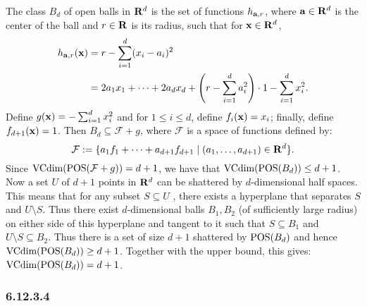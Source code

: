 The class $B_d$ of open balls in $\mathbf{R}^d$ is the set of functions $h_{\mathbf{a}, r}$,
where $\mathbf{a} \in \mathbf{R}^d$ is the center of the ball and $r \in \mathbf{R}$ is its radius,
such that for $\mathbf{x} \in \mathbf{R}^d$,
\begin{align*}
    h_{\mathbf{a}, r} (\mathbf{x}) & = r - \sum_{i = 1}^d (x_i - a_i)^2 \\
    & = 2 a_1 x_1 + \cdots + 2 a_d x_d +
    \left ( r - \sum_{i = 1}^d a_i^2 \right ) \cdot 1 - \sum_{i = 1}^d x_i^2.
\end{align*}
Define $g(\mathbf{x}) = - \sum_{i = 1}^d x_i^2$ and for $1 \leq i \leq d$, define
$f_i(\mathbf{x}) = x_i$; finally, define $f_{d + 1}(\mathbf{x}) = 1$. Then
$B_d \subseteq \mathcal{F} + g$, where $\mathcal{F}$ is a space of functions defined by:
\[
    \mathcal{F} := \{a_1 f_1 + \cdots + a_{d + 1} f_{d + 1} \mid
        (a_1, \ldots, a_{d + 1}) \in \mathbf{R}^d\}.
\]
Since $\text{VCdim} ( \operatorname{POS} (\mathcal{F} + g)) = d + 1$, we have that
$\text{VCdim} (\operatorname{POS} (B_d)) \leq d + 1$. Now a set $U$ of $d + 1$ points in $\mathbf{R}^d$ can be
shattered by $d$-dimensional half spaces. This means that for any subset
$S \subseteq U$ , there exists a hyperplane that separates $S$ and $U \setminus S$.
Thus there exist $d$-dimensional balls $B_1, B_2$ (of sufficiently large radius)
on either side of this hyperplane and tangent to it such that $S \subseteq B_1$
and $U \setminus S \subseteq B_2$. Thus there is a set of size $d + 1$ shattered
by $\operatorname{POS} (B_d)$ and hence $\text{VCdim} (\operatorname{POS} (B_d)) \geq  d + 1$. Together with
the upper bound, this gives:  $\text{VCdim} (\operatorname{POS} (B_d)) =  d + 1$.

\subsubsection*{6.12.3.4}

